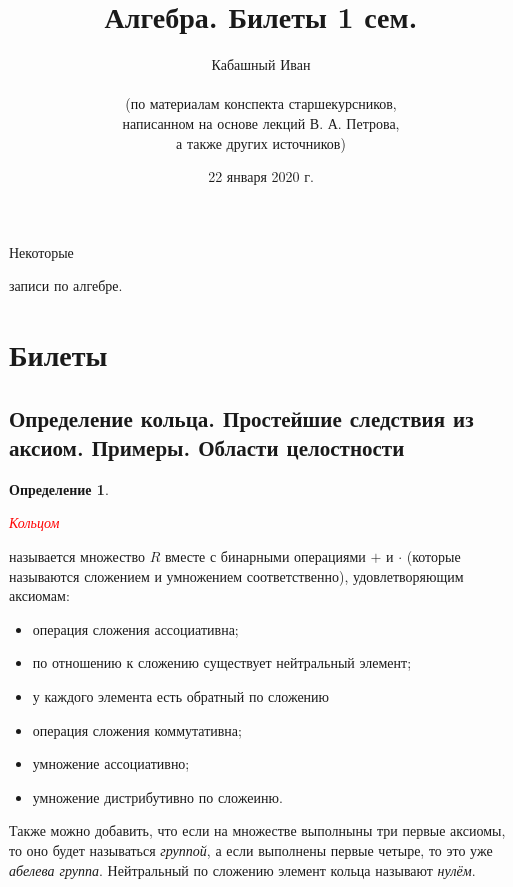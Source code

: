 \documentclass[a4paper,100pt]{article}
\title{Алгебра. Билеты 1 сем.}
\author{Кабашный Иван\\ \\ (по материалам конспекта старшекурсников, \\ написанном на основе лекций В. А. Петрова,\\ а также других источников)}
\date{22 января 2020 г.}
\theoremstyle{indented}
\theoremstyle{definition}
\newtheorem{defn}{Определение}
\theoremstyle{remark}
\begin{document}
\newcommand{\resetexlcounters}{%
  \setcounter{exl}{0}%
} 

\newcommand{\resetremarkcounters}{%
  \setcounter{remark}{0}%
} 

\newcommand{\reseconscounters}{%
  \setcounter{cons}{0}%
} 

\newcommand{\resetall}{%
    \resetexlcounters
    \resetremarkcounters
    \reseconscounters%
}

\maketitle 

\newpage

\hypertarget{t1}{Некоторые} записи по алгебре.
\tableofcontents

\newpage



\section{Билеты}



\subsection{Определение кольца. Простейшие следствия из аксиом. Примеры. Области целостности}

\medskip

\begin{defn}
    \hypertarget{n1}{\textcolor{red}{\textit{Кольцом}}} называется множество $R$ вместе с бинарными операциями $+$ и $\cdot$ (которые называются сложением и умножением соответственно), удовлетворяющим аксиомам:\

    \begin{itemize}
        \item операция сложения ассоциативна;
        \item по отношению к сложению существует нейтральный элемент;
        \item у каждого элемента есть обратный по сложению
        \item операция сложения коммутативна;
        \item умножение ассоциативно;
        \item умножение дистрибутивно по сложеиню.
    \end{itemize}
\end{defn}

Также можно добавить, что если на множестве выполныны три первые аксиомы, то оно будет называться \textit{группой}, а если выполнены первые четыре, то это уже \textit{абелева группа}. Нейтральный по сложению элемент кольца называют \textit{нулём}.
\end{document}
